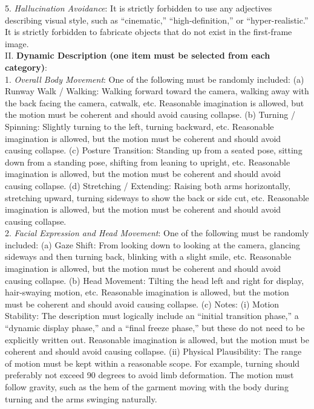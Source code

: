 \documentclass{llmxive}
\begin{document}
\begin{tcolorbox}[
    colback=gray!10,
    colframe=gray!30,
    boxrule=0.3pt,
    arc=1.5pt,
    left=6pt,
    right=6pt,
    top=6pt,
    bottom=6pt
]
    5. \textit{Hallucination Avoidance}: It is strictly forbidden to use any adjectives describing visual style, such as ``cinematic,'' ``high-definition,'' or ``hyper-realistic.'' It is strictly forbidden to fabricate objects that do not exist in the first-frame image.
\\
II. \textbf{Dynamic Description (one item must be selected from each category)}:
\\
    1. \textit{Overall Body Movement}: One of the following must be randomly included:
        (a) Runway Walk / Walking: Walking forward toward the camera, walking away with the back facing the camera, catwalk, etc. Reasonable imagination is allowed, but the motion must be coherent and should avoid causing collapse.
        (b) Turning / Spinning: Slightly turning to the left, turning backward, etc. Reasonable imagination is allowed, but the motion must be coherent and should avoid causing collapse.
        (c) Posture Transition: Standing up from a seated pose, sitting down from a standing pose, shifting from leaning to upright, etc. Reasonable imagination is allowed, but the motion must be coherent and should avoid causing collapse.
        (d) Stretching / Extending: Raising both arms horizontally, stretching upward, turning sideways to show the back or side cut, etc. Reasonable imagination is allowed, but the motion must be coherent and should avoid causing collapse.
\\
    2. \textit{Facial Expression and Head Movement}: One of the following must be randomly included:
        (a) Gaze Shift: From looking down to looking at the camera, glancing sideways and then turning back, blinking with a slight smile, etc. Reasonable imagination is allowed, but the motion must be coherent and should avoid causing collapse.
        (b) Head Movement: Tilting the head left and right for display, hair-swaying motion, etc. Reasonable imagination is allowed, but the motion must be coherent and should avoid causing collapse.
        (c) Notes:
            (i) Motion Stability: The description must logically include an “initial transition phase,” a “dynamic display phase,” and a “final freeze phase,” but these do not need to be explicitly written out. Reasonable imagination is allowed, but the motion must be coherent and should avoid causing collapse.
            (ii) Physical Plausibility: The range of motion must be kept within a reasonable scope. For example, turning should preferably not exceed 90 degrees to avoid limb deformation. The motion must follow gravity, such as the hem of the garment moving with the body during turning and the arms swinging naturally.

\end{tcolorbox}
\end{document}
